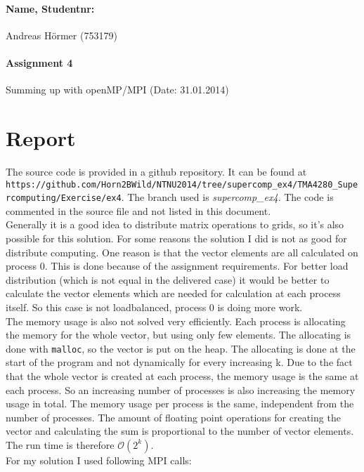 \documentclass{article}
\begin{document}
\paragraph{Name, Studentnr: }Andreas H\"ormer (753179)
\paragraph{Assignment 4}Summing up with openMP/MPI (Date: 31.01.2014)

	\section{Report}
		The source code is provided in a github repository. It can be found at\\
		\small{\texttt{https://github.com/Horn2BWild/NTNU2014/tree/supercomp\_ex4/TMA4280\_Supercomputing/Exercise/ex4}. The branch used is \textit{supercomp\_ex4}}. The code is commented in the source file and not listed in this document.\\
		Generally it is a good idea to distribute matrix operations to grids, so it's also possible for this solution. For some reasons the solution I did is not as good for distribute computing. One reason is that the vector elements are all calculated on process 0. This is done because of the assignment requirements. For better load distribution (which is not equal in the delivered case) it would be better to calculate the vector elements which are needed for calculation at each process itself. So this case is not loadbalanced, process 0 is doing more work.\\
The memory usage is also not solved very efficiently. Each process is allocating the memory for the whole vector, but using only few elements. The allocating is done with \texttt{malloc}, so the vector is put on the heap. The allocating is done at the start of the program and not dynamically for every increasing k. Due to the fact that the whole vector is created at each process, the memory usage is the same at each process. So an increasing number of processes is also increasing the memory usage in total. The memory usage per process is the same, independent from the number of processes. 
The amount of floating point operations for creating the vector and calculating the sum is proportional to the number of vector elements. The run time is therefore $\mathcal{O}(2^k)$.\\
For my solution I used following MPI calls:
\end{document}
